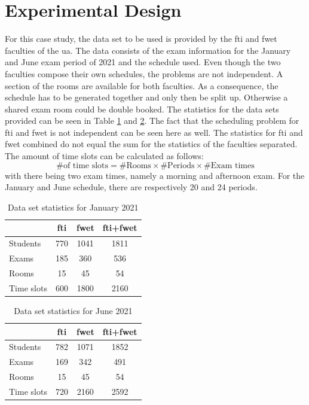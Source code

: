 \section{Experimental Design}\label{sec:experiment}

For this case study, the data set to be used is provided by the \acrshort{fti} and \acrshort{fwet} faculties of the \acrfull{ua}. The data consists of the exam information for the January and June exam period of 2021 and the schedule used. Even though the two faculties compose their own schedules, the problems are not independent. A section of the rooms are available for both faculties. As a consequence, the schedule has to be generated together and only then be split up. Otherwise a shared exam room could be double booked. The statistics for the data sets provided can be seen in Table \ref{tab:data_set_sem1} and \ref{tab:data_set_sem2}. The fact that the scheduling problem for \acrshort{fti} and \acrshort{fwet} is not independent can be seen here as well. The statistics for \acrshort{fti} and \acrshort{fwet} combined do not equal the sum for the statistics of the faculties separated. The amount of time slots can be calculated as follows:
\begin{equation}
    \text{\# of time slots} = \text{\# Rooms} \times \text{\# Periods} \times \text{\# Exam times}  
\end{equation}
with there being two exam times, namely a morning and afternoon exam. For the January and June schedule, there are respectively 20 and 24 periods.
\begin{table}[h]
	\caption{Data set statistics for January 2021}
	\label{tab:data_set_sem1}
	\centering
	\begin{tabular}{l c c c }
		\hline
		& \textbf{\acrshort{fti}} & \textbf{\acrshort{fwet}} & \textbf{\acrshort{fti}+\acrshort{fwet}} \\ \hline
		Students & 770 & 1041 & 1811 \\
		Exams & 185 & 360 & 536 \\
	    Rooms & 15 & 45 & 54 \\
        Time slots & 600 & 1800 & 2160 \\ \hline
	\end{tabular}
\end{table}

\begin{table}[h]
	\caption{Data set statistics for June 2021}
	\label{tab:data_set_sem2}
	\centering
	\begin{tabular}{l c c c }
		\hline
		& \textbf{\acrshort{fti}} & \textbf{\acrshort{fwet}} & \textbf{\acrshort{fti}+\acrshort{fwet}} \\ \hline
		Students & 782 & 1071 & 1852 \\
		Exams & 169 & 342 & 491 \\
	    Rooms & 15 & 45 & 54 \\
        Time slots & 720 & 2160 & 2592 \\ \hline
	\end{tabular}
\end{table}


